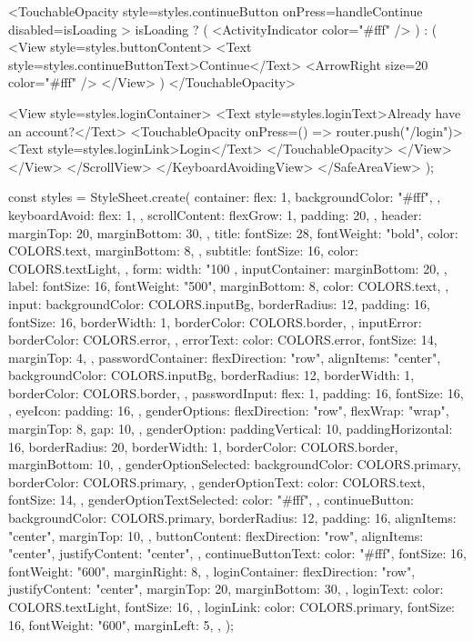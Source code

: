 {            <TouchableOpacity
              style={styles.continueButton}
              onPress={handleContinue}
              disabled={isLoading}
            >
              {isLoading ? (
                <ActivityIndicator color="#fff" />
              ) : (
                <View style={styles.buttonContent}>
                  <Text style={styles.continueButtonText}>Continue</Text>
                  <ArrowRight size={20} color="#fff" />
                </View>
              )}
            </TouchableOpacity>

            <View style={styles.loginContainer}>
              <Text style={styles.loginText}>Already have an account?</Text>
              <TouchableOpacity onPress={() => router.push("/login")}>
                <Text style={styles.loginLink}>Login</Text>
              </TouchableOpacity>
            </View>
          </View>
        </ScrollView>
      </KeyboardAvoidingView>
    </SafeAreaView>
  );
}

const styles = StyleSheet.create({
  container: {
    flex: 1,
    backgroundColor: "#fff",
  },
  keyboardAvoid: {
    flex: 1,
  },
  scrollContent: {
    flexGrow: 1,
    padding: 20,
  },
  header: {
    marginTop: 20,
    marginBottom: 30,
  },
  title: {
    fontSize: 28,
    fontWeight: "bold",
    color: COLORS.text,
    marginBottom: 8,
  },
  subtitle: {
    fontSize: 16,
    color: COLORS.textLight,
  },
  form: {
    width: "100%
  },
  inputContainer: {
    marginBottom: 20,
  },
  label: {
    fontSize: 16,
    fontWeight: "500",
    marginBottom: 8,
    color: COLORS.text,
  },
  input: {
    backgroundColor: COLORS.inputBg,
    borderRadius: 12,
    padding: 16,
    fontSize: 16,
    borderWidth: 1,
    borderColor: COLORS.border,
  },
  inputError: {
    borderColor: COLORS.error,
  },
  errorText: {
    color: COLORS.error,
    fontSize: 14,
    marginTop: 4,
  },
  passwordContainer: {
    flexDirection: "row",
    alignItems: "center",
    backgroundColor: COLORS.inputBg,
    borderRadius: 12,
    borderWidth: 1,
    borderColor: COLORS.border,
  },
  passwordInput: {
    flex: 1,
    padding: 16,
    fontSize: 16,
  },
  eyeIcon: {
    padding: 16,
  },
  genderOptions: {
    flexDirection: "row",
    flexWrap: "wrap",
    marginTop: 8,
    gap: 10,
  },
  genderOption: {
    paddingVertical: 10,
    paddingHorizontal: 16,
    borderRadius: 20,
    borderWidth: 1,
    borderColor: COLORS.border,
    marginBottom: 10,
  },
  genderOptionSelected: {
    backgroundColor: COLORS.primary,
    borderColor: COLORS.primary,
  },
  genderOptionText: {
    color: COLORS.text,
    fontSize: 14,
  },
  genderOptionTextSelected: {
    color: "#fff",
  },
  continueButton: {
    backgroundColor: COLORS.primary,
    borderRadius: 12,
    padding: 16,
    alignItems: "center",
    marginTop: 10,
  },
  buttonContent: {
    flexDirection: "row",
    alignItems: "center",
    justifyContent: "center",
  },
  continueButtonText: {
    color: "#fff",
    fontSize: 16,
    fontWeight: "600",
    marginRight: 8,
  },
  loginContainer: {
    flexDirection: "row",
    justifyContent: "center",
    marginTop: 20,
    marginBottom: 30,
  },
  loginText: {
    color: COLORS.textLight,
    fontSize: 16,
  },
  loginLink: {
    color: COLORS.primary,
    fontSize: 16,
    fontWeight: "600",
    marginLeft: 5,
  },
});
